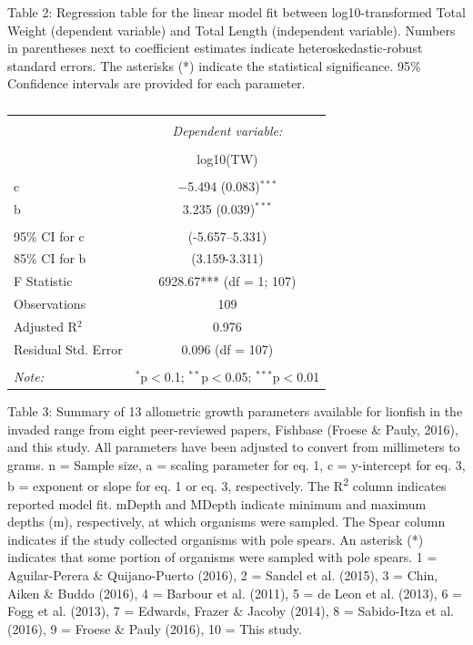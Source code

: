 \documentclass[12pt,]{article}
\begin{document}
\clearpage

Table 2: Regression table for the linear model fit between
log10-transformed Total Weight (dependent variable) and Total Length
(independent variable). Numbers in parentheses next to coefficient
estimates indicate heteroskedastic-robust standard errors. The asterisks
(*) indicate the statistical significance. 95\% Confidence intervals are
provided for each parameter.

\begin{table}[!htbp] \centering 
  \caption{} 
  \label{} 
\begin{tabular}{@{\extracolsep{5pt}}lc} 
\\[-1.8ex]\hline 
\hline \\[-1.8ex] 
 & \multicolumn{1}{c}{\textit{Dependent variable:}} \\ 
\cline{2-2} 
\\[-1.8ex] & log10(TW) \\ 
\hline \\[-1.8ex] 
 c & $-$5.494 (0.083)$^{***}$ \\ 
  b & 3.235 (0.039)$^{***}$ \\ 
 \hline \\[-1.8ex] 
95\% CI for c & (-5.657--5.331) \\ 
85\% CI for b & (3.159-3.311) \\ 
F Statistic & 6928.67*** (df = 1; 107) \\ 
Observations & 109 \\ 
Adjusted R$^{2}$ & 0.976 \\ 
Residual Std. Error & 0.096 (df = 107) \\ 
\hline 
\hline \\[-1.8ex] 
\textit{Note:}  & \multicolumn{1}{r}{$^{*}$p$<$0.1; $^{**}$p$<$0.05; $^{***}$p$<$0.01} \\ 
\end{tabular} 
\end{table}

\clearpage

Table 3: Summary of 13 allometric growth parameters available for
lionfish in the invaded range from eight peer-reviewed papers, Fishbase
(Froese \& Pauly, 2016), and this study. All parameters have been
adjusted to convert from millimeters to grams. n = Sample size, a =
scaling parameter for eq. 1, c = y-intercept for eq. 3, b = exponent or
slope for eq. 1 or eq. 3, respectively. The R\textsuperscript{2} column
indicates reported model fit. mDepth and MDepth indicate minimum and
maximum depths (m), respectively, at which organisms were sampled. The
Spear column indicates if the study collected organisms with pole
spears. An asterisk (*) indicates that some portion of organisms were
sampled with pole spears. 1 = Aguilar-Perera \& Quijano-Puerto (2016), 2
= Sandel et al. (2015), 3 = Chin, Aiken \& Buddo (2016), 4 = Barbour et
al. (2011), 5 = de Leon et al. (2013), 6 = Fogg et al. (2013), 7 =
Edwards, Frazer \& Jacoby (2014), 8 = Sabido-Itza et al. (2016), 9 =
Froese \& Pauly (2016), 10 = This study.
\end{document}
